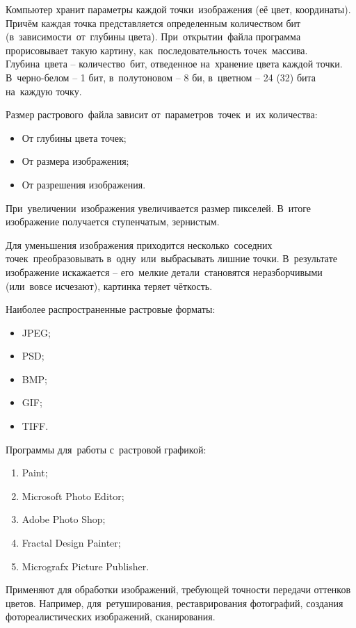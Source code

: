 \documentclass{ou}
\begin{document}
Компьютер хранит параметры каждой точки~изображения (её цвет, координаты). Причём каждая точка представляется определенным количеством бит (в~зависимости~от~глубины цвета). При~открытии~файла программа прорисовывает такую картину, как~последовательность точек~массива. Глубина~цвета -- количество~бит, отведенное на~хранение цвета каждой точки. В~черно-белом -- 1 бит, в~полутоновом -- 8 би, в~цветном -- 24 (32) бита на~каждую точку.

Размер растрового~файла зависит от~параметров~точек~и~их количества:
\begin{itemize}[label=-, itemindent=2em, nosep]
\item От глубины цвета точек;
\item От размера изображения;
\item От разрешения изображения.
\end{itemize}

При~увеличении~изображения увеличивается размер пикселей. В~итоге изображение получается ступенчатым, зернистым.
 
Для уменьшения изображения приходится несколько~соседних точек~преобразовывать в~одну~или~выбрасывать лишние точки. В~результате изображение искажается -- его~мелкие детали~становятся неразборчивыми (или~вовсе исчезают), картинка теряет чёткость. 

Наиболее распространенные растровые форматы: 
\begin{itemize}[label=-, itemindent=2em, nosep]
\item JPEG;
\item PSD;
\item BMP;
\item GIF;
\item TIFF.
\end{itemize}

Программы для~работы с~растровой графикой:
\begin{enumerate}[itemindent=2em, nosep, label=\arabic*)]
\item Paint;
\item Microsoft Photo Editor;
\item Adobe Photo Shop;
\item Fractal Design Painter;
\item Micrografx Picture Publisher.
\end{enumerate}

Применяют для обработки изображений, требующей точности передачи оттенков цветов.  Например, для~ретуширования, реставрирования фотографий, создания фотореалистических изображений, сканирования.
\end{document}
